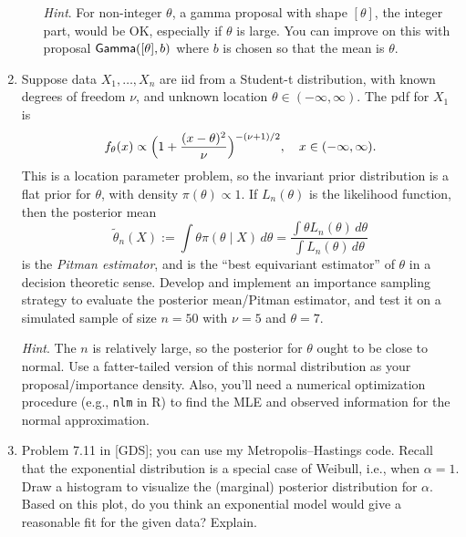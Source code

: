 \documentclass[a4paper,12pt]{article}
\begin{document}
\begin{enumerate}
\begin{enumerate}
\emph{Hint}.  For non-integer $\theta$, a gamma proposal with shape $[\theta]$, the integer part, would be OK, especially if $\theta$ is large.  You can improve on this with proposal ${\sf Gamma}([\theta],b)$ where $b$ is chosen so that the mean is $\theta$.  
\end{enumerate}

\item Suppose data $X_1,\ldots,X_n$ are iid from a Student-t distribution, with known degrees of freedom $\nu$, and unknown location $\theta \in (-\infty, \infty)$.  The pdf for $X_1$ is 
\[ f_\theta(x) \propto \Bigl(1 + \frac{(x-\theta)^2}{\nu} \Bigr)^{-(\nu+1)/2}, \quad x \in (-\infty,\infty). \]
This is a location parameter problem, so the invariant prior distribution is a flat prior for $\theta$, with density $\pi(\theta) \propto 1$.  If $L_n(\theta)$ is the likelihood function, then the posterior mean 
\[ \tilde\theta_n(X) := \int \theta \pi(\theta \mid X) \,d\theta = \frac{\int \theta L_n(\theta) \,d\theta}{\int L_n(\theta) \,d\theta} \]
is the \emph{Pitman estimator}, and is the ``best equivariant estimator'' of $\theta$ in a decision theoretic sense.  Develop and implement an importance sampling strategy to evaluate the posterior mean/Pitman estimator, and test it on a simulated sample of size $n=50$ with $\nu=5$ and $\theta=7$.  

\emph{Hint}. The $n$ is relatively large, so the posterior for $\theta$ ought to be close to normal.  Use a fatter-tailed version of this normal distribution as your proposal/importance density.  Also, you'll need a numerical optimization procedure (e.g., {\tt nlm} in R) to find the MLE and observed information for the normal approximation.  



\item Problem 7.11 in [GDS]; you can use my Metropolis--Hastings code.  Recall that the exponential distribution is a special case of Weibull, i.e., when $\alpha=1$.  Draw a histogram to visualize the (marginal) posterior distribution for $\alpha$.  Based on this plot, do you think an exponential model would give a reasonable fit for the given data?  Explain.  


\end{enumerate}
\end{document}
